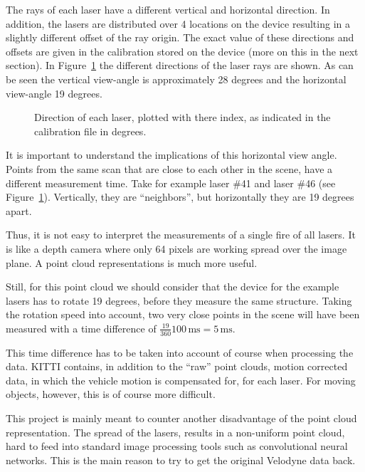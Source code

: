 \documentclass[english]{article}
\begin{document}
The rays of each laser have a different vertical and horizontal
direction. In addition, the lasers are distributed over 4 locations on
the device resulting in a slightly different offset of the ray origin.
The exact value of these directions and offsets are given in the
calibration stored on the device (more on this in the next section).
In Figure~\ref{fig:directions} the different directions of the laser
rays are shown. As can be seen the vertical view-angle is approximately
28 degrees and the horizontal view-angle 19 degrees.

\begin{figure}
    \centering
    \def\svgwidth{\columnwidth}
    \scalebox{0.9}{
    \def\svgwidth{.6 \columnwidth}
      
    }
    \caption{Direction of each laser, plotted with there index, as
    indicated in the calibration file in degrees.}
		\label{fig:directions}
\end{figure}

It is important to understand the implications of this horizontal view
angle. Points from the same scan that are close to each other in the
scene, have a different measurement time. Take for example laser \#41
and laser \#46 (see Figure~\ref{fig:directions}). Vertically, they are
``neighbors'', but horizontally they are 19 degrees apart.

Thus, it is not easy to interpret the measurements of a single fire of all
lasers. It is like a depth camera where only 64 pixels are working spread over
the image plane. A point cloud representations is much more useful.

Still, for this point cloud we should consider that the device for the
example lasers has to rotate 19 degrees, before they measure the same
structure. Taking the rotation speed into account, two very close points
in the scene will have been measured with a time difference of
$\frac{19}{360} 100 \, \mbox{ms}= 5 \, \mbox{ms}$.

This time difference has to be taken into account of course when
processing the data. KITTI contains, in addition to the ``raw'' point
clouds, motion corrected data, in which the vehicle motion is
compensated for, for each laser. For moving objects, however, this is of
course more difficult.

This project is mainly meant to counter another
disadvantage of the point cloud representation. The spread of the
lasers, results in a non-uniform point cloud, hard to feed into standard image
processing tools such as convolutional neural networks. This is the main reason
to try to get the original Velodyne data back.
\end{document}
